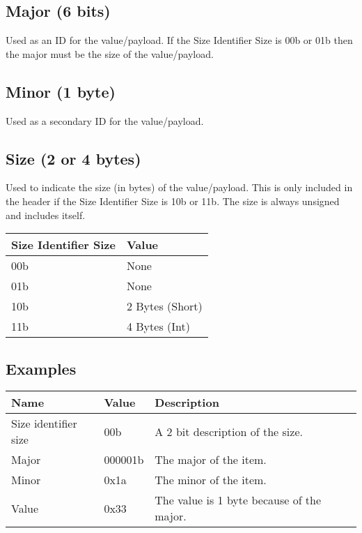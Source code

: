 \documentclass[11pt]{article}
\begin{document}
\subsection{Major (6 bits)}
Used as an ID for the value/payload. If the Size Identifier Size is 00b or 01b then the major must be the size of the value/payload.

\subsection{Minor (1 byte)}
Used as a secondary ID for the value/payload.

\subsection{Size (2 or 4 bytes)}
Used to indicate the size (in bytes) of the value/payload. This is only included in the header if the Size Identifier Size is 10b or 11b. The size is always unsigned and includes itself.

\begin{center}
\begin{tabular}{ |l|l| } 
\hline
\textbf{Size Identifier Size} & \textbf{Value}\\
\hline
00b & None \\  
01b & None \\  
10b & 2 Bytes (Short) \\  
11b & 4 Bytes (Int) \\
\hline
\end{tabular}
\end{center}

\subsection{Examples}

\begin{center}
\begin{tabular}{ |l|l|l|l| } 
\hline
\textbf{Name} & \textbf{Value} & \textbf{Description}\\
\hline
Size identifier size & 00b & A 2 bit description of the size.\\  
Major & 000001b & The major of the item.\\ 
Minor & 0x1a & The minor of the item.\\ 
Value & 0x33 & The value is 1 byte because of the major.\\ 
\hline
\end{tabular}
\end{center}
\end{document}
